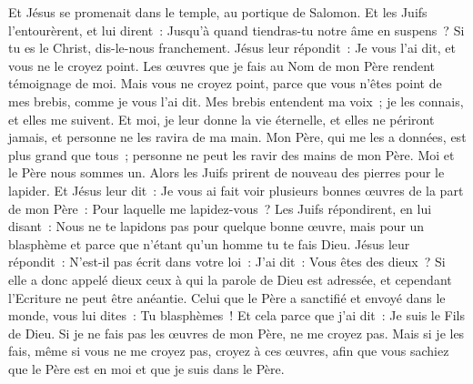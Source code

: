 \begin{multicols}{2}
Et Jésus se promenait dans le temple, au portique de Salomon.
Et les Juifs l'entourèrent, et lui dirent~: Jusqu'à quand tiendras-tu notre âme en suspens~? Si tu es le Christ, dis-le-nous franchement.
Jésus leur répondit~: Je vous l'ai dit, et vous ne le croyez point. Les œuvres que je fais au Nom de mon Père rendent témoignage de moi.
Mais vous ne croyez point, parce que vous n'êtes point de mes brebis, comme je vous l'ai dit.
Mes brebis entendent ma voix~; je les connais, et elles me suivent.
Et moi, je leur donne la vie éternelle, et elles ne périront jamais, et personne ne les ravira de ma main.
Mon Père, qui me les a données, est plus grand que tous~; personne ne peut les ravir des mains de mon Père.
Moi et le Père nous sommes un.
Alors les Juifs prirent de nouveau des pierres pour le lapider.
Et Jésus leur dit~: Je vous ai fait voir plusieurs bonnes œuvres de la part de mon Père~: Pour laquelle me lapidez-vous~?
Les Juifs répondirent, en lui disant~: Nous ne te lapidons pas pour quelque bonne œuvre, mais pour un blasphème et parce que n'étant qu'un homme tu te fais Dieu.
Jésus leur répondit~: N'est-il pas écrit dans votre loi~: J'ai dit~: Vous êtes des dieux~?
Si elle a donc appelé dieux ceux à qui la parole de Dieu est adressée, et cependant l'Ecriture ne peut être anéantie.
Celui que le Père a sanctifié et envoyé dans le monde, vous lui dites~: Tu blasphèmes~! Et cela parce que j'ai dit~: Je suis le Fils de Dieu.
Si je ne fais pas les œuvres de mon Père, ne me croyez pas.
Mais si je les fais, même si vous ne me croyez pas, croyez à ces œuvres, afin que vous sachiez que le Père est en moi et que je suis dans le Père.

\end{multicols}
